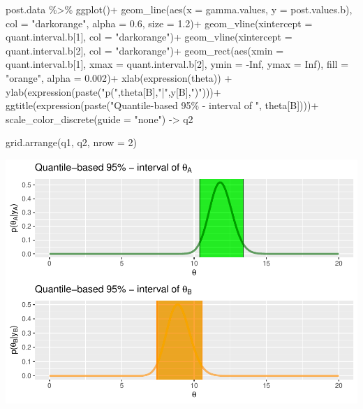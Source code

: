\documentclass[
  11pt,
]{article}
\newenvironment{Shaded}{\begin{snugshade}}{\end{snugshade}}
\newcommand{\AttributeTok}[1]{\textcolor[rgb]{0.77,0.63,0.00}{#1}}
\newcommand{\ConstantTok}[1]{\textcolor[rgb]{0.00,0.00,0.00}{#1}}
\newcommand{\DecValTok}[1]{\textcolor[rgb]{0.00,0.00,0.81}{#1}}
\newcommand{\FloatTok}[1]{\textcolor[rgb]{0.00,0.00,0.81}{#1}}
\newcommand{\FunctionTok}[1]{\textcolor[rgb]{0.00,0.00,0.00}{#1}}
\newcommand{\NormalTok}[1]{#1}
\newcommand{\OtherTok}[1]{\textcolor[rgb]{0.56,0.35,0.01}{#1}}
\newcommand{\SpecialCharTok}[1]{\textcolor[rgb]{0.00,0.00,0.00}{#1}}
\newcommand{\StringTok}[1]{\textcolor[rgb]{0.31,0.60,0.02}{#1}}
\begin{document}
\begin{Shaded}
\begin{Highlighting}[]
\NormalTok{post.data }\SpecialCharTok{\%\textgreater{}\%} \FunctionTok{ggplot}\NormalTok{()}\SpecialCharTok{+}
  \FunctionTok{geom\_line}\NormalTok{(}\FunctionTok{aes}\NormalTok{(}\AttributeTok{x =}\NormalTok{ gamma.values, }\AttributeTok{y =}\NormalTok{ post.values.b), }\AttributeTok{col =} \StringTok{"darkorange"}\NormalTok{, }\AttributeTok{alpha =} \FloatTok{0.6}\NormalTok{, }\AttributeTok{size =} \FloatTok{1.2}\NormalTok{)}\SpecialCharTok{+} 
  \FunctionTok{geom\_vline}\NormalTok{(}\AttributeTok{xintercept =}\NormalTok{ quant.interval.b[}\DecValTok{1}\NormalTok{], }\AttributeTok{col =} \StringTok{"darkorange"}\NormalTok{)}\SpecialCharTok{+}
  \FunctionTok{geom\_vline}\NormalTok{(}\AttributeTok{xintercept =}\NormalTok{ quant.interval.b[}\DecValTok{2}\NormalTok{], }\AttributeTok{col =} \StringTok{"darkorange"}\NormalTok{)}\SpecialCharTok{+}
  \FunctionTok{geom\_rect}\NormalTok{(}\FunctionTok{aes}\NormalTok{(}\AttributeTok{xmin =}\NormalTok{ quant.interval.b[}\DecValTok{1}\NormalTok{], }\AttributeTok{xmax =}\NormalTok{ quant.interval.b[}\DecValTok{2}\NormalTok{], }\AttributeTok{ymin =} \SpecialCharTok{{-}}\ConstantTok{Inf}\NormalTok{, }\AttributeTok{ymax =} \ConstantTok{Inf}\NormalTok{), }\AttributeTok{fill =} \StringTok{"orange"}\NormalTok{, }\AttributeTok{alpha =} \FloatTok{0.002}\NormalTok{)}\SpecialCharTok{+}
  \FunctionTok{xlab}\NormalTok{(}\FunctionTok{expression}\NormalTok{(theta)) }\SpecialCharTok{+}
  \FunctionTok{ylab}\NormalTok{(}\FunctionTok{expression}\NormalTok{(}\FunctionTok{paste}\NormalTok{(}\StringTok{"p("}\NormalTok{,theta[B],}\StringTok{"|"}\NormalTok{,y[B],}\StringTok{")"}\NormalTok{)))}\SpecialCharTok{+}
  \FunctionTok{ggtitle}\NormalTok{(}\FunctionTok{expression}\NormalTok{(}\FunctionTok{paste}\NormalTok{(}\StringTok{"Quantile{-}based 95\% {-} interval of "}\NormalTok{, theta[B])))}\SpecialCharTok{+}
  \FunctionTok{scale\_color\_discrete}\NormalTok{(}\AttributeTok{guide =} \StringTok{"none"}\NormalTok{) }\OtherTok{{-}\textgreater{}}\NormalTok{ q2}


\FunctionTok{grid.arrange}\NormalTok{(q1, q2, }\AttributeTok{nrow =} \DecValTok{2}\NormalTok{)}
\end{Highlighting}
\end{Shaded}

\includegraphics{1_hw_bs_code_files/figure-latex/x2a2-1.pdf} \normalsize
\end{document}
